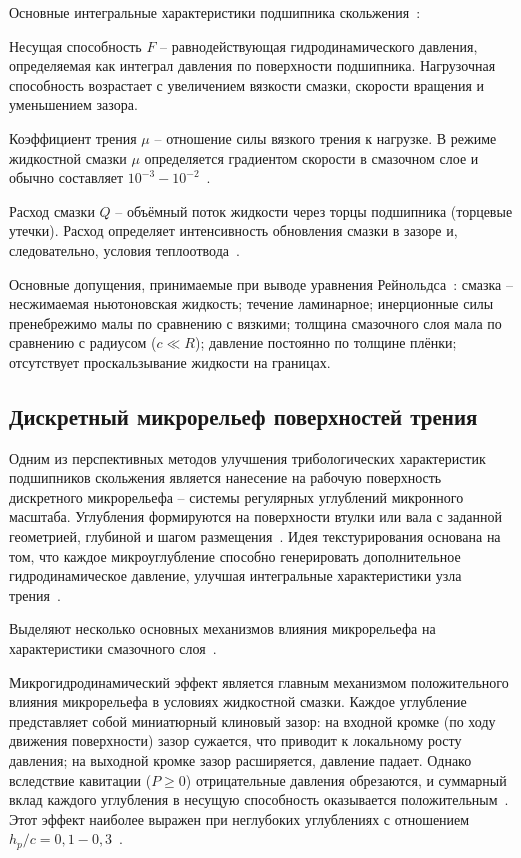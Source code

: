 Основные интегральные характеристики подшипника скольжения~\cite{hamrock}:

Несущая способность $F$ -- равнодействующая гидродинамического давления, определяемая как интеграл давления по поверхности подшипника. Нагрузочная способность возрастает с увеличением вязкости смазки, скорости вращения и уменьшением зазора.

Коэффициент трения $\mu$ -- отношение силы вязкого трения к нагрузке. В режиме жидкостной смазки $\mu$ определяется градиентом скорости в смазочном слое и обычно составляет $10^{-3} - 10^{-2}$~\cite{pinkus}.

Расход смазки $Q$ -- объёмный поток жидкости через торцы подшипника (торцевые утечки). Расход определяет интенсивность обновления смазки в зазоре и, следовательно, условия теплоотвода~\cite{hamrock}.

Основные допущения, принимаемые при выводе уравнения Рейнольдса~\cite{hamrock}: смазка -- несжимаемая ньютоновская жидкость; течение ламинарное; инерционные силы пренебрежимо малы по сравнению с вязкими; толщина смазочного слоя мала по сравнению с радиусом ($c \ll R$); давление постоянно по толщине плёнки; отсутствует проскальзывание жидкости на границах.

\subsection{Дискретный микрорельеф поверхностей трения}

Одним из перспективных методов улучшения трибологических характеристик подшипников скольжения является нанесение на рабочую поверхность дискретного микрорельефа -- системы регулярных углублений микронного масштаба. Углубления формируются на поверхности втулки или вала с заданной геометрией, глубиной и шагом размещения~\cite{etsion2005}. Идея текстурирования основана на том, что каждое микроуглубление способно генерировать дополнительное гидродинамическое давление, улучшая интегральные характеристики узла трения~\cite{gropper2016}.

Выделяют несколько основных механизмов влияния микрорельефа на характеристики смазочного слоя~\cite{fowell2007, gropper2016}.

Микрогидродинамический эффект является главным механизмом положительного влияния микрорельефа в условиях жидкостной смазки. Каждое углубление представляет собой миниатюрный клиновый зазор: на входной кромке (по ходу движения поверхности) зазор сужается, что приводит к локальному росту давления; на выходной кромке зазор расширяется, давление падает. Однако вследствие кавитации ($P \geq 0$) отрицательные давления обрезаются, и суммарный вклад каждого углубления в несущую способность оказывается положительным~\cite{fowell2007, brizmer2003}. Этот эффект наиболее выражен при неглубоких углублениях с отношением $h_p/c = 0{,}1 - 0{,}3$~\cite{rahmani2007}.

